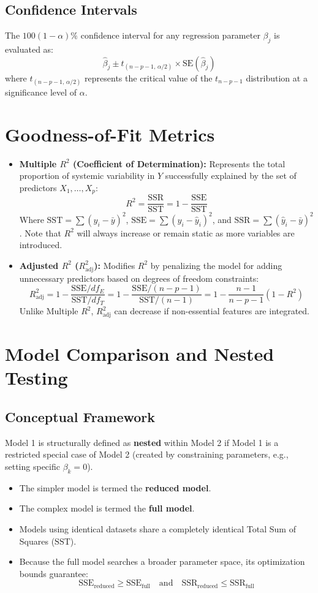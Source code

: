 \documentclass{article}
\begin{document}
\subsection{Confidence Intervals}
The $100(1-\alpha)\%$ confidence interval for any regression parameter $\beta_j$ is evaluated as:
$$\hat{\beta}_j \pm t_{(n-p-1, \, \alpha/2)} \times \text{SE}(\hat{\beta}_j)$$
where $t_{(n-p-1, \, \alpha/2)}$ represents the critical value of the $t_{n-p-1}$ distribution at a significance level of $\alpha$.

\section{Goodness-of-Fit Metrics}

\begin{itemize}
    \item \textbf{Multiple $R^2$ (Coefficient of Determination):} Represents the total proportion of systemic variability in $Y$ successfully explained by the set of predictors $X_1, \dots, X_p$:
    $$R^2 = \frac{\text{SSR}}{\text{SST}} = 1 - \frac{\text{SSE}}{\text{SST}}$$
    Where $\text{SST} = \sum (y_i - \bar{y})^2$, $\text{SSE} = \sum (y_i - \hat{y}_i)^2$, and $\text{SSR} = \sum (\hat{y}_i - \bar{y})^2$. Note that $R^2$ will always increase or remain static as more variables are introduced.
    \item \textbf{Adjusted $R^2$ ($R_{\text{adj}}^2$):} Modifies $R^2$ by penalizing the model for adding unnecessary predictors based on degrees of freedom constraints:
    $$R_{\text{adj}}^2 = 1 - \frac{\text{SSE}/df_E}{\text{SST}/df_T} = 1 - \frac{\text{SSE}/(n-p-1)}{\text{SST}/(n-1)} = 1 - \frac{n-1}{n-p-1}(1-R^2)$$
    Unlike Multiple $R^2$, $R_{\text{adj}}^2$ can decrease if non-essential features are integrated.
\end{itemize}

\section{Model Comparison and Nested Testing}

\subsection{Conceptual Framework}
Model 1 is structurally defined as \textbf{nested} within Model 2 if Model 1 is a restricted special case of Model 2 (created by constraining parameters, e.g., setting specific $\beta_k = 0$). 
\begin{itemize}
    \item The simpler model is termed the \textbf{reduced model}.
    \item The complex model is termed the \textbf{full model}.
    \item Models using identical datasets share a completely identical Total Sum of Squares ($\text{SST}$).
    \item Because the full model searches a broader parameter space, its optimization bounds guarantee:
    $$\text{SSE}_{\text{reduced}} \geq \text{SSE}_{\text{full}} \quad \text{and} \quad \text{SSR}_{\text{reduced}} \leq \text{SSR}_{\text{full}}$$
\end{itemize}
\end{document}
